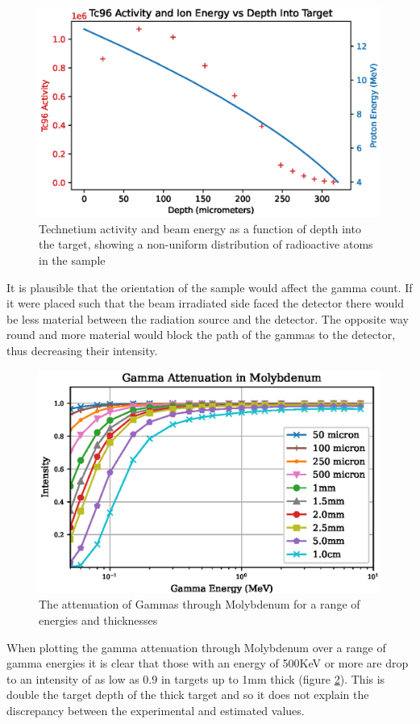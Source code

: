 \begin{figure}[htb]
\centering
\includegraphics[width=0.7\linewidth]{chapters/activity_code/mo-john-hewett/mo96_pn_tc96_activity_depth.eps}
\caption{Technetium activity and beam energy as a function of depth into the target, showing a non-uniform distribution of radioactive atoms in the sample}
\label{fig:mo96tc96activitydepth}
\end{figure}

It is plausible that the orientation of the sample would affect the gamma count.  If it were placed such that the beam irradiated side faced the detector there would be less material between the radiation source and the detector.  The opposite way round and more material would block the path of the gammas to the detector, thus decreasing their intensity.

\begin{figure}[htb]
\centering
\includegraphics[width=0.7\linewidth]{chapters/activity_code/mo-john-hewett/attenuation/mo_gamma_attenuation.eps}
\caption{The attenuation of Gammas through Molybdenum for a range of energies and thicknesses\cite{massattenuation}}
\label{fig:moattenuation}
\end{figure}

When plotting the gamma attenuation through Molybdenum over a range of gamma energies it is clear that those with an energy of 500KeV or more are drop to an intensity of as low as 0.9 in targets up to 1mm thick (figure \ref{fig:moattenuation})\cite{massattenuation}.  This is double the target depth of the thick target and so it does not explain the discrepancy between the experimental and estimated values.



